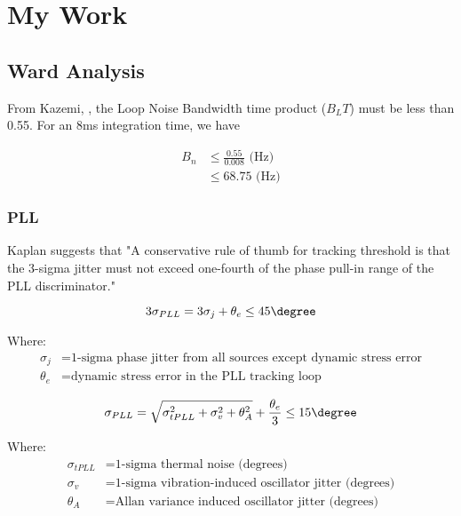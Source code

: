 \chapter{My Work}\label{ch:MyWork}
\section{Ward Analysis}

From Kazemi, \cite{Kazemi2008}, the Loop Noise Bandwidth time product ($B_L T$) must be less than 0.55. 
For an 8ms integration time, we have 

\begin{align*}
B_n &\leq \frac{0.55}{0.008} \text{ (Hz)}\\
    &\leq 68.75 \text{ (Hz)}
\end{align*}

\subsection{PLL}
Kaplan suggests that "A conservative rule of thumb for tracking threshold is that the 3-sigma jitter must not exceed one-fourth of the phase pull-in range of the PLL discriminator." %

\begin{equation}
3 \sigma_{PLL} = 3 \sigma_j +\theta_e \leq 45 \degree
\end{equation}

Where:
\begin{align*}
\sigma_j &= \text{1-sigma phase jitter from all sources except dynamic stress error} \\
\theta_e &= \text{dynamic stress error in the PLL tracking loop}
\end{align*}



\begin{equation}
\sigma_{PLL} = \sqrt{\sigma^2_{tPLL} + \sigma^2_v+ \theta^2_A} + \frac{\theta_e}{3} \leq 15 \degree 
\end{equation}

Where:
\begin{align*}
\sigma_{tPLL} &= \text{1-sigma thermal noise (degrees)}\\
\sigma_v &= \text{1-sigma vibration-induced oscillator jitter (degrees)}\\
\theta_A &= \text{Allan variance induced oscillator jitter (degrees)}
\end{align*}


